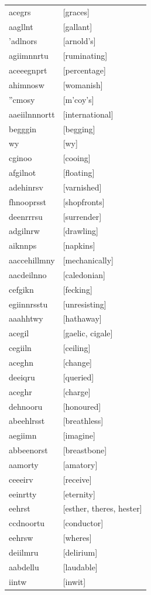 \documentclass{article}
\begin{document}
\begin{tabular}{ll}
acegrs & [graces] \\
aagllnt & [gallant] \\
'adlnors & [arnold's] \\
agiimnnrtu & [ruminating] \\
aceeegnprt & [percentage] \\
ahimnosw & [womanish] \\
''cmosy & [m'coy's] \\
aaeiilnnnortt & [international] \\
begggin & [begging] \\
wy & [wy] \\
cginoo & [cooing] \\
afgilnot & [floating] \\
adehinrsv & [varnished] \\
fhnooprsst & [shopfronts] \\
deenrrrsu & [surrender] \\
adgilnrw & [drawling] \\
aiknnps & [napkins] \\
aaccehillmny & [mechanically] \\
aacdeilnno & [caledonian] \\
cefgikn & [fecking] \\
egiinnrsstu & [unresisting] \\
aaahhtwy & [hathaway] \\
acegil & [gaelic, cigale] \\
cegiiln & [ceiling] \\
aceghn & [change] \\
deeiqru & [queried] \\
aceghr & [charge] \\
dehnooru & [honoured] \\
abeehlrsst & [breathless] \\
aegiimn & [imagine] \\
abbeenorst & [breastbone] \\
aamorty & [amatory] \\
ceeeirv & [receive] \\
eeinrtty & [eternity] \\
eehrst & [esther, theres, hester] \\
ccdnoortu & [conductor] \\
eehrsw & [wheres] \\
deiilmru & [delirium] \\
aabdellu & [laudable] \\
iintw & [inwit] \\

\end{tabular}
\end{document}
